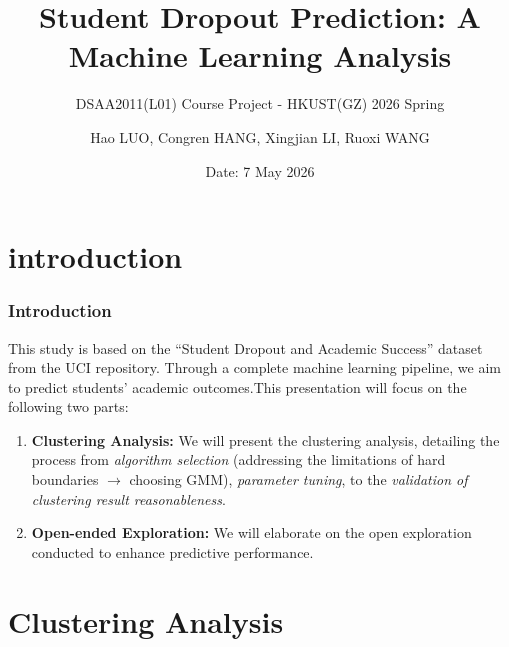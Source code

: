 \documentclass[aspectratio=169]{beamer}
\title{Student Dropout Prediction: A Machine Learning Analysis}
\subtitle{DSAA2011(L01) Course Project - HKUST(GZ) 2026 Spring}
\author{Hao LUO, Congren HANG, Xingjian LI, Ruoxi WANG}
\date{Date: 7 May 2026}
\institute{Group 9}
\begin{document}
\begin{frame}
\titlepage
\end{frame}

\section{introduction}
\begin{frame}
\frametitle{Introduction}

This study is based on the ``Student Dropout and Academic Success'' dataset from the UCI repository. Through a complete machine learning pipeline, we aim to predict students' academic outcomes.This presentation will focus on the following two  parts:

\begin{enumerate}
    \item \textbf{Clustering Analysis:} We will present the clustering analysis, detailing the process from \textit{algorithm selection} (addressing the limitations of hard boundaries $\rightarrow$ choosing GMM), \textit{parameter tuning}, to the \textit{validation of clustering result reasonableness}.
    
    \item \textbf{Open-ended Exploration:} We will elaborate on the open exploration conducted to enhance predictive performance.
\end{enumerate}

\end{frame}


\section{Clustering Analysis}
\end{document}

